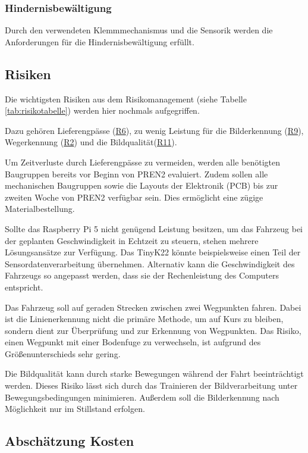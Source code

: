 \documentclass[../main.tex]{subfiles}
\begin{document}
\subsubsection{Hindernisbewältigung}
Durch den verwendeten Klemmmechanismus und die Sensorik werden die Anforderungen für die Hindernisbewältigung erfüllt.

\newpage
\subsection{Risiken}
Die wichtigsten Risiken aus dem Risikomanagement (siehe Tabelle \ref{tab:risikotabelle}) werden hier nochmals aufgegriffen.

Dazu gehören Lieferengpässe (\hyperlink{R6}{R6}), zu wenig Leistung für die Bilderkennung (\hyperlink{R9}{R9}), Wegerkennung (\hyperlink{R2}{R2}) und die Bildqualität(\hyperlink{R11}{R11}). 

Um Zeitverluste durch Lieferengpässe zu vermeiden, werden alle benötigten Baugruppen bereits vor Beginn von PREN2 evaluiert. Zudem sollen alle mechanischen Baugruppen sowie die Layouts der Elektronik (PCB) bis zur zweiten Woche von PREN2 verfügbar sein. Dies ermöglicht eine zügige Materialbestellung.

Sollte das Raspberry Pi 5 nicht genügend Leistung besitzen, um das Fahrzeug bei der geplanten Geschwindigkeit in Echtzeit zu steuern, stehen mehrere Lösungsansätze zur Verfügung. Das TinyK22 könnte beispielsweise einen Teil der Sensordatenverarbeitung übernehmen. Alternativ kann die Geschwindigkeit des Fahrzeugs so angepasst werden, dass sie der Rechenleistung des Computers entspricht.

Das Fahrzeug soll auf geraden Strecken zwischen zwei Wegpunkten fahren. Dabei ist die Linienerkennung nicht die primäre Methode, um auf Kurs zu bleiben, sondern dient zur Überprüfung und zur Erkennung von Wegpunkten. Das Risiko, einen Wegpunkt mit einer Bodenfuge zu verwechseln, ist aufgrund des Größenunterschieds sehr gering.

Die Bildqualität kann durch starke Bewegungen während der Fahrt beeinträchtigt werden. Dieses Risiko lässt sich durch das Trainieren der Bildverarbeitung unter Bewegungsbedingungen minimieren. Außerdem soll die Bilderkennung nach Möglichkeit nur im Stillstand erfolgen.

\subsection{Abschätzung Kosten}
\end{document}
